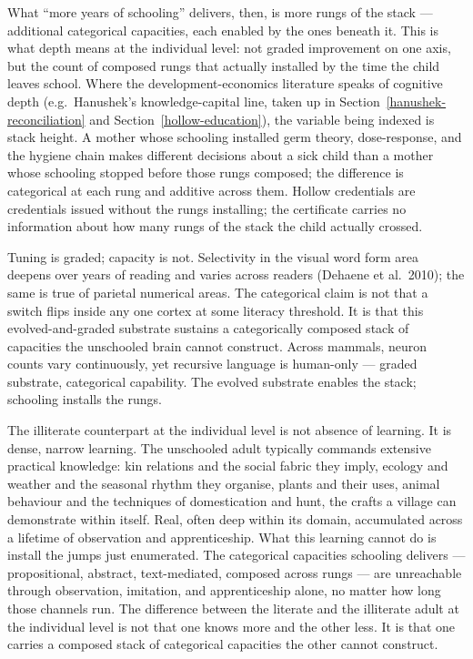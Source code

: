 \documentclass[12pt,letterpaper]{article}
\begin{document}
What ``more years of schooling'' delivers, then, is more rungs of
the stack --- additional categorical capacities, each enabled by
the ones beneath it. This is what depth means at the individual
level: not graded improvement on one axis, but the count of
composed rungs that actually installed by the time the child leaves
school. Where the development-economics literature speaks of cognitive
depth (e.g.\ Hanushek's knowledge-capital line, taken up in
Section~\ref{hanushek-reconciliation} and
Section~\ref{hollow-education}), the variable being indexed is
stack height. A mother whose schooling installed germ theory,
dose-response, and the hygiene chain makes different decisions
about a sick child than a mother whose schooling stopped before
those rungs composed; the difference is categorical at each rung
and additive across them. Hollow credentials are credentials issued
without the rungs installing; the certificate carries no
information about how many rungs of the stack the child actually
crossed.

Tuning is graded; capacity is not. Selectivity in the visual word
form area deepens over years of reading and varies across readers
(Dehaene et al.\ 2010); the same is true of parietal numerical areas.
The categorical claim is not that a switch flips inside any one
cortex at some literacy threshold. It is that this evolved-and-graded
substrate sustains a categorically composed stack of capacities the
unschooled brain cannot construct. Across mammals, neuron counts
vary continuously, yet recursive language is human-only --- graded
substrate, categorical capability. The evolved substrate enables
the stack; schooling installs the rungs.

The illiterate counterpart at the individual level is not absence
of learning. It is dense, narrow learning. The unschooled adult
typically commands extensive practical knowledge: kin relations and
the social fabric they imply, ecology and weather and the seasonal
rhythm they organise, plants and their uses, animal behaviour and
the techniques of domestication and hunt, the crafts a village can
demonstrate within itself. Real, often deep within its domain,
accumulated across a lifetime of observation and apprenticeship.
What this learning cannot do is install the jumps just enumerated.
The categorical capacities schooling delivers --- propositional,
abstract, text-mediated, composed across rungs --- are unreachable
through observation, imitation, and apprenticeship alone, no matter
how long those channels run. The difference between the literate
and the illiterate adult at the individual level is not that one
knows more and the other less. It is that one carries a composed
stack of categorical capacities the other cannot construct.
\end{document}

